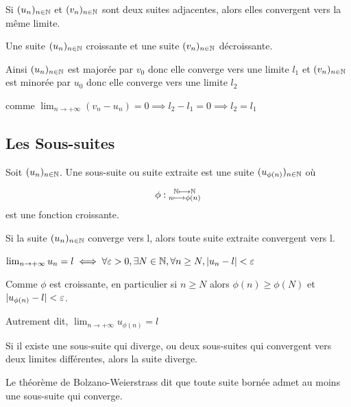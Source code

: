 \documentclass[a4paper, 12pt]{article}
\begin{document}
\begin{theorem}
    Si $(u_n)_{n \in \mathbb{N}}$ et $(v_n)_{n \in \mathbb{N}}$ sont deux suites adjacentes, alors elles convergent vers la même limite.
\end{theorem}

\begin{demonstration}
    Une suite $(u_n)_{n \in \mathbb{N}}$ croissante et une suite $(v_n)_{n \in \mathbb{N}}$ décroissante.

    Ainsi $(u_n)_{n \in \mathbb{N}}$ est majorée par $v_0$ donc elle converge vers une limite $l_1$
    et $(v_n)_{n \in \mathbb{N}}$ est minorée par $u_0$ donc elle converge vers une limite $l_2$

    comme $\lim_{n \to +\infty}(v_n - u_n) = 0 \implies l_2 - l_1 = 0 \implies l_2 = l_1$
\end{demonstration}

\subsection{Les Sous-suites}

\begin{definition}
    Soit $(u_n)_{n \in \mathbb{N}}$. Une sous-suite ou suite extraite est une suite
    $(u_{\phi(n)})_{n \in \mathbb{N}}$ où

    $$
    \phi: \substack{\mathbb{N} \longmapsto \mathbb{N} \\ n \longmapsto \phi(n)}
    $$
    est une fonction croissante.
\end{definition}

\begin{proposition}
    Si la suite $(u_n)_{n \in \mathbb{N}}$ converge vers l, alors toute suite extraite convergent vers l.
\end{proposition}

\begin{demonstration}
    $\lim_{n \to +\infty}u_n = l \iff \forall \varepsilon > 0, \exists N \in \mathbb{N}, \forall n \geq N, |u_n - l| < \varepsilon$

    Comme $\phi$ est croissante, en particulier si $n \geq N$ alors $\phi(n) \geq \phi(N)$ et $|u_{\phi(n)}-l| < \varepsilon$.

    Autrement dit, $\lim_{n \to +\infty} u_{\phi(n)} = l$
\end{demonstration}

\begin{corollaire}
    Si il existe une sous-suite qui diverge, ou deux sous-suites qui convergent vers
    deux limites différentes, alors la suite diverge.
\end{corollaire}

\begin{theorem}
    Le théorème de Bolzano-Weierstrass dit que toute suite bornée admet au moins une sous-suite qui converge.
\end{theorem}
\end{document}
